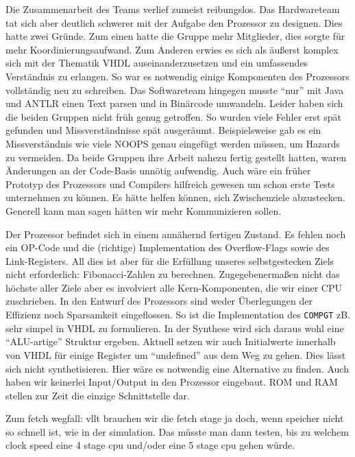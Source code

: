\documentclass[paper=a4,fontsize=12pt,twocolumn]{scrreprt}
\begin{document}
Die Zusammenarbeit des Teams verlief zumeist reibungslos.
Das Hardwareteam tat sich aber deutlich schwerer mit der Aufgabe den Prozessor zu designen.
Dies hatte zwei Gründe.
Zum einen hatte die Gruppe mehr Mitglieder, dies sorgte für mehr Koordinierungsaufwand.
Zum Anderen erwies es sich als äußerst komplex sich mit der Thematik VHDL auseinanderzusetzen und ein umfassendes Verständnis zu erlangen.
So war es notwendig einige Komponenten des Prozessors vollständig neu zu schreiben.
Das Softwareteam hingegen musste \enquote{nur} mit Java und ANTLR einen Text parsen und in Binärcode umwandeln. 
Leider haben sich die beiden Gruppen nicht früh genug getroffen.
So wurden viele Fehler erst spät gefunden und Missverständnisse spät ausgeräumt.
Beispielsweise gab es ein Missverständnis wie viele NOOPS genau eingefügt werden müssen, um Hazards zu vermeiden.
Da beide Gruppen ihre Arbeit nahezu fertig gestellt hatten, waren Änderungen an der Code-Basis unnötig aufwendig.
Auch wäre ein früher Prototyp des Prozessors und Compilers hilfreich gewesen um schon erste Tests unternehmen zu können.
Es hätte helfen können, sich Zwischenziele abzustecken.
Generell kann man sagen hätten wir mehr Kommunizieren sollen.


Der Prozessor befindet sich in einem annähernd fertigen Zustand.
Es fehlen noch ein OP-Code und die (richtige) Implementation des Overflow-Flags sowie des Link-Registers.
All dies ist aber für die Erfüllung unseres selbstgestecken Ziels nicht erforderlich: Fibonacci-Zahlen zu berechnen.
Zugegebenermaßen nicht das höchste aller Ziele aber es involviert alle Kern-Komponenten, die wir einer CPU zuschrieben.
In den Entwurf des Prozessors sind weder Überlegungen der Effizienz noch Sparsamkeit eingeflossen.
So ist die Implementation des \texttt{COMPGT} zB. sehr simpel in VHDL zu formulieren.
In der Synthese wird sich daraus wohl eine \enquote{ALU-artige} Struktur ergeben.
Aktuell setzen wir auch Initialwerte innerhalb von VHDL für einige Register um \enquote{undefined} aus dem Weg zu gehen.
Dies lässt sich nicht synthetisieren.
Hier wäre es notwendig eine Alternative zu finden.
Auch haben wir keinerlei Input/Output in den Prozessor eingebaut.
ROM und RAM stellen zur Zeit die einzige Schnittstelle dar.

Zum fetch wegfall: vllt brauchen wir die fetch stage ja doch, wenn speicher nicht so schnell ist, wie in der simulation.
Das müsste man dann testen, bis zu welchem clock speed eine 4 stage cpu und/oder eine 5 stage cpu gehen würde.
\end{document}
